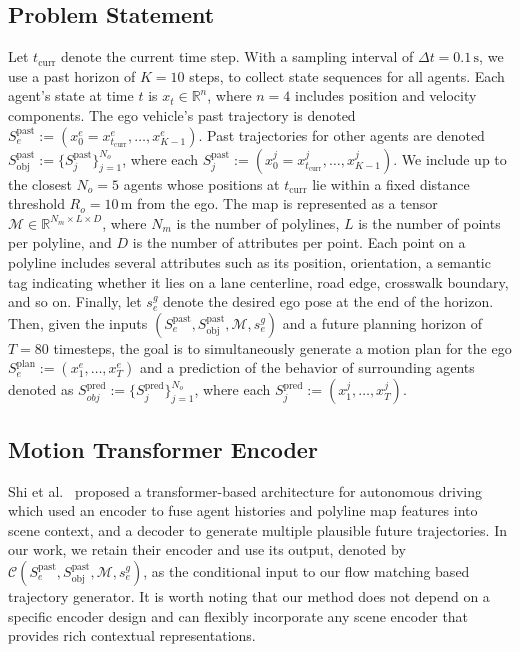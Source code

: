 \documentclass[conference]{IEEEtran}
\begin{document}
\subsection{Problem Statement}
Let \(t_{\text{curr}}\) denote the current time step. With a sampling interval of \(\Delta t = 0.1\,\text{s}\), we use a past horizon of \(K = 10\) steps, to collect state sequences for all agents. Each agent’s state at time \(t\) is \(x_t \in \mathbb{R}^n\), where \(n = 4\) includes position and velocity components. The ego vehicle’s past trajectory is denoted \(S^\text{past}_e := (x^e_0 = x^e_{t_{\text{curr}}}, \ldots, x^e_{K - 1})\). Past trajectories for other agents are denoted \(S^\text{past}_\text{obj} := \{S^\text{past}_j\}_{j=1}^{N_o}\), where each \(S^\text{past}_j := (x^j_0 = x^j_{t_\text{curr}}, \ldots, x^j_{K - 1})\). We include up to the closest \(N_o = 5\) agents whose positions at \(t_{\text{curr}}\) lie within a fixed distance threshold \(R_o = 10\,\text{m}\) from the ego. The map is represented as a tensor $\mathcal{M} \in \mathbb{R}^{N_m \times L \times D}$, where $N_m$ is the number of polylines, $L$ is the number of points per polyline, and $D$ is the number of attributes per point. Each point on a polyline includes several attributes such as its position, orientation, a semantic tag indicating whether it lies on a lane centerline, road edge, crosswalk boundary, and so on. Finally, let \(s^g_e\) denote the desired ego pose at the end of the horizon. Then, given the inputs \((S^{\text{past}}_e, S^{\text{past}}_{\text{obj}}, \mathcal{M}, s^g_e)\) and a future planning horizon of \(T = 80\) timesteps, the goal is to simultaneously generate a motion plan for the ego \(S^{\text{plan}}_e := (x^e_1, \ldots, x^e_{T})\) and a prediction of the behavior of surrounding agents denoted as \(S^\text{pred}_{obj} := \{S^\text{pred}_j\}_{j=1}^{N_o}\), where each \(S^\text{pred}_{j}:= (x^j_1, \ldots, x^j_{T})\).

\subsection{Motion Transformer Encoder}
Shi et al.~\cite{mtr} proposed a transformer-based architecture for autonomous driving which used an encoder to fuse agent histories and polyline map features into scene context, and a decoder to generate multiple plausible future trajectories. In our work, we retain their encoder and use its output, denoted by \(\mathcal{C}(S^{\text{past}}_e, S^{\text{past}}_{\text{obj}}, \mathcal{M},s^g_e)\), as the conditional input to our flow matching based trajectory generator. It is worth noting that our method does not depend on a specific encoder design and can flexibly incorporate any scene encoder that provides rich contextual representations.
\end{document}
